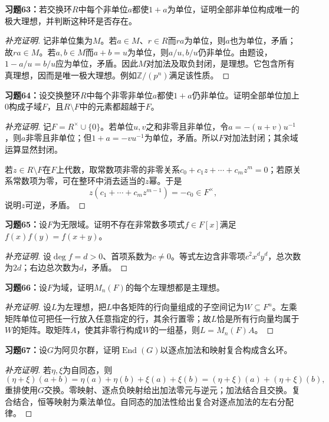 \begin{problem}
\textbf{习题63：}若交换环$R$中每个非单位$a$都使$1+a$为单位，证明全部非单位构成唯一的极大理想，并判断这种环是否存在。
\end{problem}
\begin{proof}[补充证明]
记非单位集为$M$。若$a\in M$、$r\in R$而$ra$为单位，则$a$也为单位，矛盾；故$ra\in M$。若$a,b\in M$而$a+b=u$为单位，则$a/u,b/u$仍非单位。由题设，$1-a/u=b/u$应为单位，矛盾。因此$M$对加法及取负封闭，是理想。它包含所有真理想，因而是唯一极大理想。例如$\mathbb Z/(p^n)$满足该性质。
\end{proof}

\begin{problem}
\textbf{习题64：}设交换整环$R$中每个非零非单位$a$都使$1+a$仍非单位。证明全部单位加上$0$构成子域$F$，且$R\setminus F$中的元素都超越于$F$。
\end{problem}
\begin{proof}[补充证明]
记$F=R^\times\cup\{0\}$。若单位$u,v$之和非零且非单位，令$a=-(u+v)u^{-1}$，则$a$非零且非单位；但$1+a=-vu^{-1}$为单位，矛盾。所以$F$对加法封闭；其余域运算显然封闭。

若$z\in R\setminus F$在$F$上代数，取常数项非零的非零关系$c_0+c_1z+\cdots+c_mz^m=0$；若原关系常数项为零，可在整环中消去适当的$z$幂。于是
\[
z(c_1+\cdots+c_mz^{m-1})=-c_0\in F^\times,
\]
说明$z$可逆，矛盾。
\end{proof}

\begin{problem}
\textbf{习题65：}设$F$为无限域。证明不存在非常数多项式$f\in F[x]$满足$f(x)f(y)=f(x+y)$。
\end{problem}
\begin{proof}[补充证明]
设$\deg f=d>0$、首项系数为$c\ne0$。等式左边含非零项$c^2x^dy^d$，总次数为$2d$；右边总次数为$d$，矛盾。
\end{proof}

\begin{problem}
\textbf{习题66：}设$F$为域，证明$M_n(F)$的每个左理想都是主理想。
\end{problem}
\begin{proof}[补充证明]
设$L$为左理想，把$L$中各矩阵的行向量组成的子空间记为$W\subseteq F^n$。左乘矩阵单位可把任一行放入任意指定的行，其余行置零；故$L$恰是所有行向量均属于$W$的矩阵。取矩阵$A$，使其非零行构成$W$的一组基，则$L=M_n(F)A$。
\end{proof}

\begin{problem}
\textbf{习题67：}设$G$为阿贝尔群，证明$\operatorname{End}(G)$以逐点加法和映射复合构成含幺环。
\end{problem}
\begin{proof}[补充证明]
若$\eta,\xi$为自同态，则
\[
(\eta+\xi)(a+b)=\eta(a)+\eta(b)+\xi(a)+\xi(b)
=(\eta+\xi)(a)+(\eta+\xi)(b),
\]
重排使用$G$交换。零映射、逐点负映射给出加法零元与逆元；加法结合且交换。复合结合，恒等映射为乘法单位。自同态的加法性给出复合对逐点加法的左右分配律。
\end{proof}

